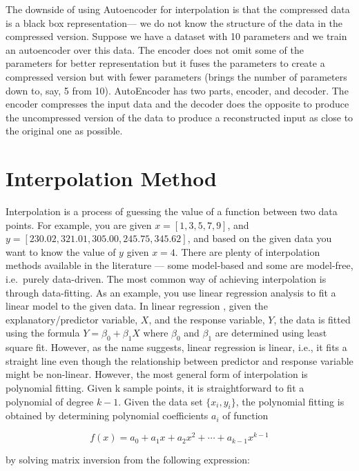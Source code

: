 \documentclass[onecolumn]{article}
\begin{document}
The downside of using Autoencoder for interpolation is that the
compressed data is a black box representation--- we do not know the
structure of the data in the compressed version. Suppose we have a
dataset with 10 parameters and we train an autoencoder over this data.
The encoder does not omit some of the parameters for better
representation but it fuses the parameters to create a compressed
version but with fewer parameters (brings the number of parameters down
to, say, 5 from 10). AutoEncoder has two parts, encoder, and decoder.
The encoder compresses the input data and the decoder does the opposite
to produce the uncompressed version of the data to produce a
reconstructed input as close to the original one as possible.

\section{Interpolation Method}\label{interpolation-method}

Interpolation is a process of guessing the value of a function between
two data points. For example, you are given \(x = [1, 3, 5, 7, 9]\), and
\(y = [230.02, 321.01, 305.00, 245.75, 345.62]\), and based on the given
data you want to know the value of \(y\) given \(x = 4\). There are
plenty of interpolation methods available in the literature --- some
model-based and some are model-free, i.e.~purely data-driven. The most
common way of achieving interpolation is through data-fitting. As an
example, you use linear regression analysis to fit a linear model to the
given data. In linear regression \citep{kutner2005applied}, given the
explanatory/predictor variable, \(X\), and the response variable, \(Y\),
the data is fitted using the formula \(Y = \beta_0 + \beta_1 X\) where
\(\beta_0\) and \(\beta_1\) are determined using least square fit.
However, as the name suggests, linear regression is linear, i.e., it
fits a straight line even though the relationship between predictor and
response variable might be non-linear. However, the most general form of
interpolation is polynomial fitting. Given k sample points, it is
straightforward to fit a polynomial of degree \(k -1\). Given the data
set \(\{x_i, y_i\}\), the polynomial fitting is obtained by determining
polynomial coefficients \(a_i\) of function

\[
f(x) = a_0 + a_1 x  + a_2 x^2 + \cdots + a_{k-1}x^{k-1}
\]

by solving matrix inversion from the following expression:
\end{document}
